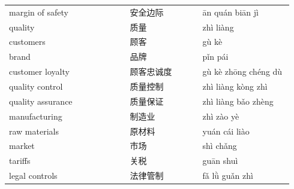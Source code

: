 \documentclass[11pt]{article}
\begin{document}
\begin{longtable}{@{}p{0.40\linewidth}p{0.24\linewidth}p{0.30\linewidth}@{}}
margin of safety & 安全边际 & ān quán biān jì \\
quality & 质量 & zhì liàng \\
customers & 顾客 & gù kè \\
brand & 品牌 & pǐn pái \\
customer loyalty & 顾客忠诚度 & gù kè zhōng chéng dù \\
quality control & 质量控制 & zhì liàng kòng zhì \\
quality assurance & 质量保证 & zhì liàng bǎo zhèng \\
manufacturing & 制造业 & zhì zào yè \\
raw materials & 原材料 & yuán cái liào \\
market & 市场 & shì chǎng \\
tariffs & 关税 & guān shuì \\
legal controls & 法律管制 & fǎ lǜ guǎn zhì \\
\end{longtable}
\end{document}
